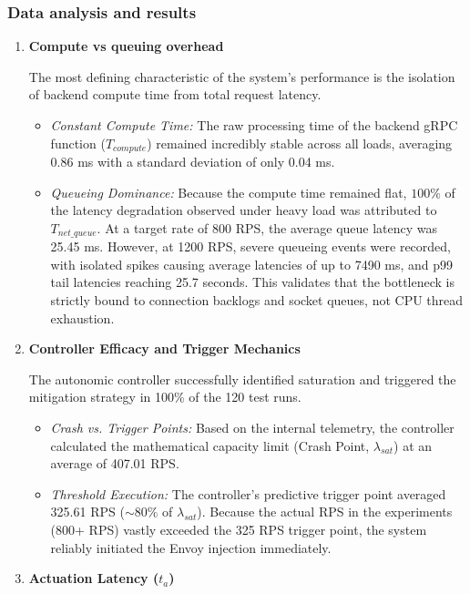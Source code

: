 \documentclass{article}
\begin{document}
\subsubsection{Data analysis and results}
\begin{enumerate}[\Alph*.]
	\item \textbf{Compute vs queuing overhead}
	
	The most defining characteristic of the system's performance is the isolation of backend compute time from total request latency.
	\begin{itemize}
		\item \textit{Constant Compute Time: }The raw processing time of the backend gRPC function ($T_{compute}$) remained incredibly stable across all loads, averaging 0.86 ms with a standard deviation of only 0.04 ms.
		
		\item \textit{Queueing Dominance: }Because the compute time remained flat, $100\%$ of the latency degradation observed under heavy load was attributed to $T_{net\_queue}$. At a target rate of 800 RPS, the average queue latency was 25.45 ms. However, at 1200 RPS, severe queueing events were recorded, with isolated spikes causing average latencies of up to 7490 ms, and p99 tail latencies reaching 25.7 seconds. This validates that the bottleneck is strictly bound to connection backlogs and socket queues, not CPU thread exhaustion.
	\end{itemize}
	
	\item \textbf{Controller Efficacy and Trigger Mechanics} 
	
	The autonomic controller successfully identified saturation and triggered the mitigation strategy in 100\% of the 120 test runs.
	\begin{itemize}
		\item \textit{Crash vs. Trigger Points: }Based on the internal telemetry, the controller calculated the mathematical capacity limit (Crash Point, $\lambda_{sat}$) at an average of 407.01 RPS.
		\item \textit{Threshold Execution: }The controller's predictive trigger point averaged 325.61 RPS ($\sim80\%$ of $\lambda_{sat}$). Because the actual RPS in the experiments (800+ RPS) vastly exceeded the 325 RPS trigger point, the system reliably initiated the Envoy injection immediately.
	\end{itemize}
	
	\item \textbf{Actuation Latency ($t_a$)} 
	

\end{enumerate}
\end{document}
